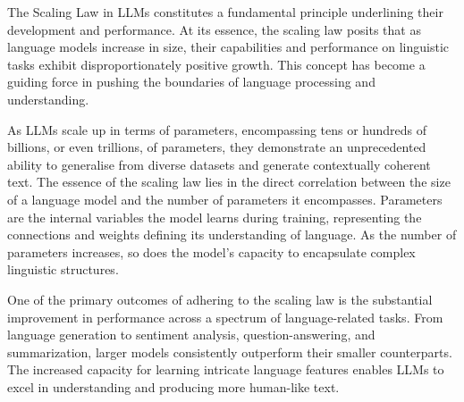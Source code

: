 The Scaling Law in LLMs constitutes a fundamental principle underlining their development and performance.
At its essence, the scaling law posits that as language models increase in size, their capabilities and performance on linguistic tasks exhibit disproportionately positive growth.
This concept has become a guiding force in pushing the boundaries of language processing and understanding.

As LLMs scale up in terms of parameters, encompassing tens or hundreds of billions, or even trillions, of parameters, they demonstrate an unprecedented ability to generalise from diverse datasets and generate contextually coherent text.
The essence of the scaling law lies in the direct correlation between the size of a language model and the number of parameters it encompasses.
Parameters are the internal variables the model learns during training, representing the connections and weights defining its understanding of language.
As the number of parameters increases, so does the model's capacity to encapsulate complex linguistic structures.

One of the primary outcomes of adhering to the scaling law is the substantial improvement in performance across a spectrum of language-related tasks.
From language generation to sentiment analysis, question-answering, and summarization, larger models consistently outperform their smaller counterparts.
The increased capacity for learning intricate language features enables LLMs to excel in understanding and producing more human-like text.

